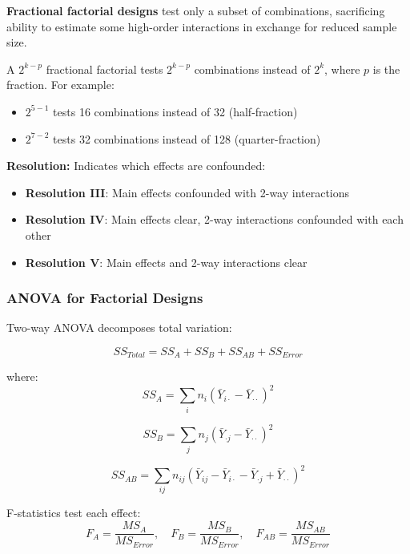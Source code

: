 \textbf{Fractional factorial designs} test only a subset of combinations, sacrificing ability to estimate some high-order interactions in exchange for reduced sample size.

A $2^{k-p}$ fractional factorial tests $2^{k-p}$ combinations instead of $2^k$, where $p$ is the fraction. For example:
\begin{itemize}
    \item $2^{5-1}$ tests 16 combinations instead of 32 (half-fraction)
    \item $2^{7-2}$ tests 32 combinations instead of 128 (quarter-fraction)
\end{itemize}

\textbf{Resolution:} Indicates which effects are confounded:
\begin{itemize}
    \item \textbf{Resolution III}: Main effects confounded with 2-way interactions
    \item \textbf{Resolution IV}: Main effects clear, 2-way interactions confounded with each other
    \item \textbf{Resolution V}: Main effects and 2-way interactions clear
\end{itemize}

\subsubsection{ANOVA for Factorial Designs}

Two-way ANOVA decomposes total variation:

\begin{equation}
SS_{Total} = SS_A + SS_B + SS_{AB} + SS_{Error}
\end{equation}

where:
\begin{equation}
SS_A = \sum_i n_i (\bar{Y}_{i\cdot} - \bar{Y}_{\cdot\cdot})^2
\end{equation}

\begin{equation}
SS_B = \sum_j n_j (\bar{Y}_{\cdot j} - \bar{Y}_{\cdot\cdot})^2
\end{equation}

\begin{equation}
SS_{AB} = \sum_{ij} n_{ij} (\bar{Y}_{ij} - \bar{Y}_{i\cdot} - \bar{Y}_{\cdot j} + \bar{Y}_{\cdot\cdot})^2
\end{equation}

F-statistics test each effect:
\begin{equation}
F_A = \frac{MS_A}{MS_{Error}}, \quad F_B = \frac{MS_B}{MS_{Error}}, \quad F_{AB} = \frac{MS_{AB}}{MS_{Error}}
\end{equation}

